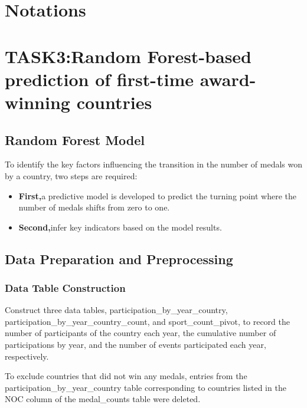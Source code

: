 \documentclass{mcmthesis}
\begin{document}
\section{Notations}







\section{TASK3:Random Forest-based prediction of first-time award-winning countries}

\subsection{Random Forest Model}
To identify the key factors influencing the transition in the number of medals won by a country, two steps are required:
\begin{itemize}
\item {\bf First,}a predictive model is developed to predict the turning point where the number of medals shifts from zero to one.        
\item {\bf Second,}infer key indicators based on the model results.
\end{itemize}

\subsection{Data Preparation and Preprocessing}

\subsubsection{Data Table Construction}
    Construct three data tables, participation\_by\_year\_country, participation\_by\_year\_country\_count, and sport\_count\_pivot, to record the number of participants of the country each year, the cumulative number of participations by year, and the number of events participated each year, respectively.

    To exclude countries that did not win any medals, entries from the participation\_by\_year\_country table corresponding to countries listed in the NOC column of the medal\_counts table were deleted.
\end{document}
